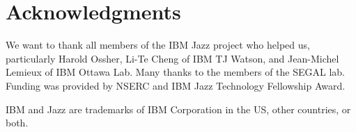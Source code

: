 \section{Acknowledgments}
We want to thank all members of the IBM Jazz project who helped us, particularly
Harold Ossher, Li-Te Cheng of IBM TJ Watson, and Jean-Michel Lemieux of IBM Ottawa Lab. Many thanks to the members of the SEGAL lab. Funding was provided by  NSERC and IBM Jazz Technology
Fellowship Award. 

IBM and Jazz are trademarks of IBM Corporation in the US, other
countries, or both.
